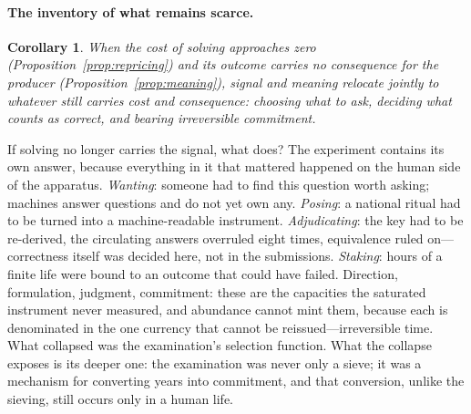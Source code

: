 \documentclass[11pt]{article}
\theoremstyle{plain}
\newtheorem*{relocationcor}{Corollary}
\begin{document}
\paragraph{The inventory of what remains scarce.}
\begin{relocationcor}
When the cost of solving approaches zero
(Proposition~\ref{prop:repricing}) and its outcome carries no consequence
for the producer (Proposition~\ref{prop:meaning}), signal and meaning
relocate jointly to whatever still carries cost and consequence: choosing
what to ask, deciding what counts as correct, and bearing irreversible
commitment.
\end{relocationcor}
If solving no longer carries the signal, what does? The experiment
contains its own answer, because everything in it that mattered happened
on the human side of the apparatus. \emph{Wanting}: someone had to find
this question worth asking; machines answer questions and do not yet own
any. \emph{Posing}: a national ritual had to be turned into a
machine-readable instrument. \emph{Adjudicating}: the key had to be
re-derived, the circulating answers overruled eight times, equivalence
ruled on---correctness itself was decided here, not in the submissions.
\emph{Staking}: hours of a finite life were bound to an outcome that
could have failed. Direction, formulation, judgment, commitment: these
are the capacities the saturated instrument never measured, and
abundance cannot mint them, because each is denominated in the one
currency that cannot be reissued---irreversible time. What collapsed was
the examination's selection function. What the collapse exposes is its
deeper one: the examination was never only a sieve; it was a mechanism
for converting years into commitment, and that conversion, unlike the
sieving, still occurs only in a human life.
\end{document}
